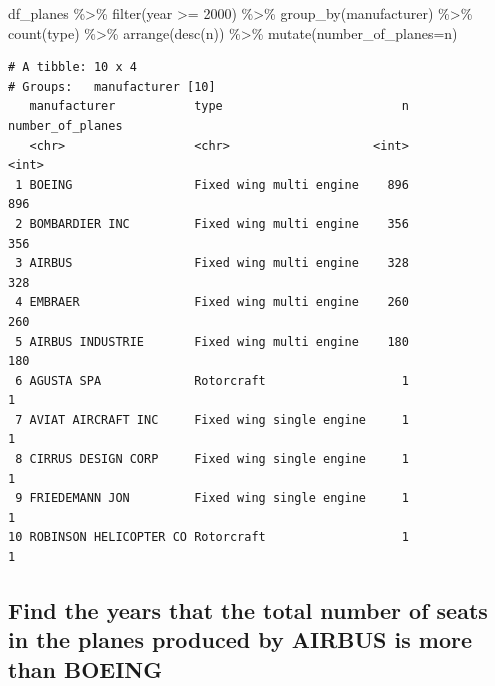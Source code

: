 \documentclass[
  letterpaper,
  DIV=11,
  numbers=noendperiod]{scrreprt}
\newenvironment{Shaded}{\begin{snugshade}}{\end{snugshade}}
\newcommand{\AttributeTok}[1]{\textcolor[rgb]{0.40,0.45,0.13}{#1}}
\newcommand{\DecValTok}[1]{\textcolor[rgb]{0.68,0.00,0.00}{#1}}
\newcommand{\FunctionTok}[1]{\textcolor[rgb]{0.28,0.35,0.67}{#1}}
\newcommand{\NormalTok}[1]{\textcolor[rgb]{0.00,0.23,0.31}{#1}}
\newcommand{\SpecialCharTok}[1]{\textcolor[rgb]{0.37,0.37,0.37}{#1}}
\begin{document}
\begin{Shaded}
\begin{Highlighting}[]
\NormalTok{df\_planes }\SpecialCharTok{\%\textgreater{}\%} \FunctionTok{filter}\NormalTok{(year }\SpecialCharTok{\textgreater{}=} \DecValTok{2000}\NormalTok{) }\SpecialCharTok{\%\textgreater{}\%} \FunctionTok{group\_by}\NormalTok{(manufacturer) }\SpecialCharTok{\%\textgreater{}\%} \FunctionTok{count}\NormalTok{(type) }\SpecialCharTok{\%\textgreater{}\%} \FunctionTok{arrange}\NormalTok{(}\FunctionTok{desc}\NormalTok{(n)) }\SpecialCharTok{\%\textgreater{}\%} 
  \FunctionTok{mutate}\NormalTok{(}\AttributeTok{number\_of\_planes=}\NormalTok{n)}
\end{Highlighting}
\end{Shaded}

\begin{verbatim}
# A tibble: 10 x 4
# Groups:   manufacturer [10]
   manufacturer           type                         n number_of_planes
   <chr>                  <chr>                    <int>            <int>
 1 BOEING                 Fixed wing multi engine    896              896
 2 BOMBARDIER INC         Fixed wing multi engine    356              356
 3 AIRBUS                 Fixed wing multi engine    328              328
 4 EMBRAER                Fixed wing multi engine    260              260
 5 AIRBUS INDUSTRIE       Fixed wing multi engine    180              180
 6 AGUSTA SPA             Rotorcraft                   1                1
 7 AVIAT AIRCRAFT INC     Fixed wing single engine     1                1
 8 CIRRUS DESIGN CORP     Fixed wing single engine     1                1
 9 FRIEDEMANN JON         Fixed wing single engine     1                1
10 ROBINSON HELICOPTER CO Rotorcraft                   1                1
\end{verbatim}

\hypertarget{find-the-years-that-the-total-number-of-seats-in-the-planes-produced-by-airbus-is-more-than-boeing}{%
\subsection{Find the years that the total number of seats in the planes
produced by AIRBUS is more than
BOEING}\label{find-the-years-that-the-total-number-of-seats-in-the-planes-produced-by-airbus-is-more-than-boeing}}
\end{document}

